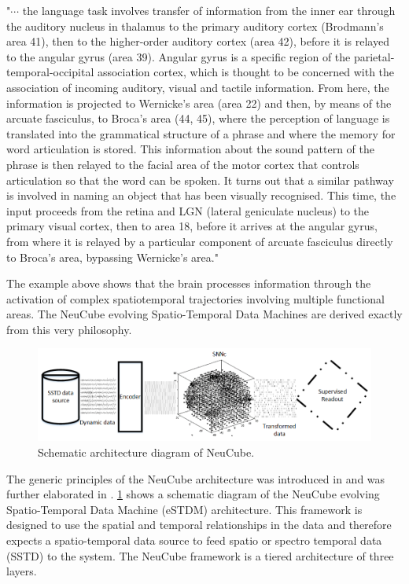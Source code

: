 "$\cdots$ the language task involves transfer of information from
the inner ear through the auditory nucleus in thalamus to the primary auditory cortex (Brodmann’s area 41), then to the higher-order auditory cortex (area 42), before it is relayed to the angular gyrus (area 39). Angular gyrus is a specific region of the parietal-temporal-occipital association cortex, which is thought to be concerned with the association of incoming auditory, visual and tactile information. From here, the information is projected to Wernicke’s area (area 22) and then, by means of the arcuate fasciculus, to Broca’s area (44, 45), where the perception of language is translated into the grammatical structure of a phrase and where the memory for word articulation is stored. This information about the sound pattern of the phrase is then relayed to the facial area of the motor cortex that controls articulation so that the word can be spoken. It turns out that a similar pathway is involved in naming an object that has been visually recognised. This time, the input proceeds from the retina and LGN (lateral geniculate nucleus) to the primary visual cortex, then to area 18, before it arrives at the angular gyrus, from where it is relayed by a particular component of arcuate fasciculus directly to Broca’s area, bypassing Wernicke’s area." 

The example above shows that the brain processes information through the activation of complex spatiotemporal trajectories involving multiple functional areas. The NeuCube evolving Spatio-Temporal Data Machines are derived exactly from this very philosophy.

\begin{figure}
	\centering
	\includegraphics[width=\linewidth]{fig/neucube/neucube_arch.png}
	\caption{Schematic architecture diagram of NeuCube.}
	\label{fig:neucube_archit}
\end{figure}

The generic principles of the NeuCube architecture was introduced in \citep{kasabov2012neucube} and was further elaborated in \citep{kasabov2014evolving, kasabov2017mapping, sengupta2018from}. \figurename \ref{fig:neucube_archit} shows a schematic diagram of the NeuCube evolving Spatio-Temporal Data Machine (eSTDM) architecture. This framework is designed to use the spatial and temporal relationships in the data and therefore expects a spatio-temporal data source to feed spatio or spectro temporal data (SSTD) to the system. The NeuCube framework is a tiered architecture of three layers.
